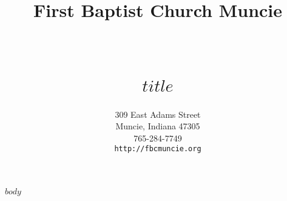 \documentclass[paper=letter,fontsize=12pt,numbers=noenddot]{scrartcl}
\title{ \vspace{-1in} 	\usefont{OT1}{bch}{b}{n}
		\huge \strut First Baptist Church Muncie \strut \\
		\Large \bfseries \strut $title$ \strut
}
\author{ 									\usefont{OT1}{bch}{m}{n}
        309 East Adams Street\\		\usefont{OT1}{bch}{m}{n}
        Muncie, Indiana 47305\\	\usefont{OT1}{bch}{m}{n}
        765-284-7749\\
        \texttt{http://fbcmuncie.org}
}
\date{}
\begin{document}
\maketitle

$body$
\end{document}

